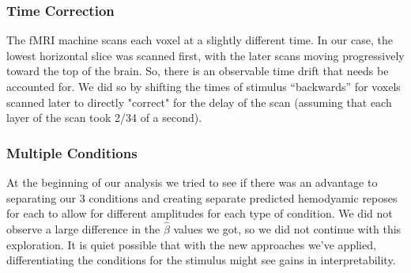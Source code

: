 \subsubsection{Time Correction}

The fMRI machine scans each voxel at a slightly different time. In our case, 
the lowest horizontal slice was scanned first, with the later scans moving 
progressively toward the top of the brain. So, there is an observable time drift 
that needs be accounted for. We did so by shifting the times of stimulus 
``backwards'' for voxels scanned later to directly "correct" for the delay of 
the scan (assuming that each layer of the scan took 2/34 of a second).

\subsubsection{Multiple Conditions}

At the beginning of our analysis we tried to see if there was an advantage to 
separating our 3 conditions and creating separate predicted hemodyamic reposes 
for each to allow for different amplitudes for each type of condition. We did 
not observe a large difference in the $\hat{\beta}$ values we got, so we did not 
continue with this exploration. It is quiet possible that with the new 
approaches we've applied, differentiating the conditions for the stimulus might 
see gains in interpretability.


